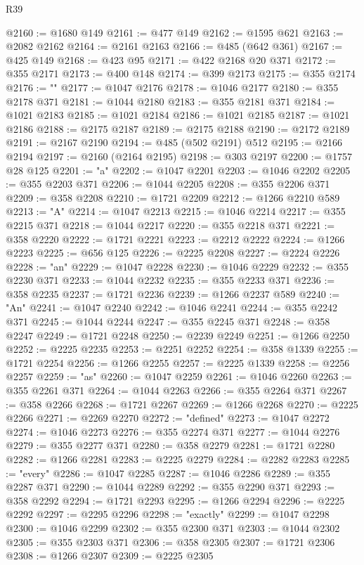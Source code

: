 \begin{lexlean}{R39}
\begin{coremodule}
@2160 := @1680 @149
@2161 := @477 @149
@2162 := @1595 @621
@2163 := @2082 @2162
@2164 := @2161 @2163
@2166 := @485 (@642 @361)
@2167 := @425 @149
@2168 := @423 @95
@2171 := @422 @2168 @20 @371
@2172 := @355 @2171
@2173 := @400 @148
@2174 := @399 @2173
@2175 := @355 @2174
@2176 := ""
@2177 := @1047 @2176
@2178 := @1046 @2177
@2180 := @355 @2178 @371
@2181 := @1044 @2180
@2183 := @355 @2181 @371
@2184 := @1021 @2183
@2185 := @1021 @2184
@2186 := @1021 @2185
@2187 := @1021 @2186
@2188 := @2175 @2187
@2189 := @2175 @2188
@2190 := @2172 @2189
@2191 := @2167 @2190
@2194 := @485 (@502 @2191) @512
@2195 := @2166 @2194
@2197 := @2160 (@2164 @2195)
@2198 := @303 @2197
@2200 := @1757 @28 @125
@2201 := "a"
@2202 := @1047 @2201
@2203 := @1046 @2202
@2205 := @355 @2203 @371
@2206 := @1044 @2205
@2208 := @355 @2206 @371
@2209 := @358 @2208
@2210 := @1721 @2209
@2212 := @1266 @2210 @589
@2213 := "A"
@2214 := @1047 @2213
@2215 := @1046 @2214
@2217 := @355 @2215 @371
@2218 := @1044 @2217
@2220 := @355 @2218 @371
@2221 := @358 @2220
@2222 := @1721 @2221
@2223 := @2212 @2222
@2224 := @1266 @2223
@2225 := @656 @125
@2226 := @2225 @2208
@2227 := @2224 @2226
@2228 := "an"
@2229 := @1047 @2228
@2230 := @1046 @2229
@2232 := @355 @2230 @371
@2233 := @1044 @2232
@2235 := @355 @2233 @371
@2236 := @358 @2235
@2237 := @1721 @2236
@2239 := @1266 @2237 @589
@2240 := "An"
@2241 := @1047 @2240
@2242 := @1046 @2241
@2244 := @355 @2242 @371
@2245 := @1044 @2244
@2247 := @355 @2245 @371
@2248 := @358 @2247
@2249 := @1721 @2248
@2250 := @2239 @2249
@2251 := @1266 @2250
@2252 := @2225 @2235
@2253 := @2251 @2252
@2254 := @358 @1339
@2255 := @1721 @2254
@2256 := @1266 @2255
@2257 := @2225 @1339
@2258 := @2256 @2257
@2259 := "as"
@2260 := @1047 @2259
@2261 := @1046 @2260
@2263 := @355 @2261 @371
@2264 := @1044 @2263
@2266 := @355 @2264 @371
@2267 := @358 @2266
@2268 := @1721 @2267
@2269 := @1266 @2268
@2270 := @2225 @2266
@2271 := @2269 @2270
@2272 := "defined"
@2273 := @1047 @2272
@2274 := @1046 @2273
@2276 := @355 @2274 @371
@2277 := @1044 @2276
@2279 := @355 @2277 @371
@2280 := @358 @2279
@2281 := @1721 @2280
@2282 := @1266 @2281
@2283 := @2225 @2279
@2284 := @2282 @2283
@2285 := "every"
@2286 := @1047 @2285
@2287 := @1046 @2286
@2289 := @355 @2287 @371
@2290 := @1044 @2289
@2292 := @355 @2290 @371
@2293 := @358 @2292
@2294 := @1721 @2293
@2295 := @1266 @2294
@2296 := @2225 @2292
@2297 := @2295 @2296
@2298 := "exactly"
@2299 := @1047 @2298
@2300 := @1046 @2299
@2302 := @355 @2300 @371
@2303 := @1044 @2302
@2305 := @355 @2303 @371
@2306 := @358 @2305
@2307 := @1721 @2306
@2308 := @1266 @2307
@2309 := @2225 @2305

\end{coremodule}
\end{lexlean}
